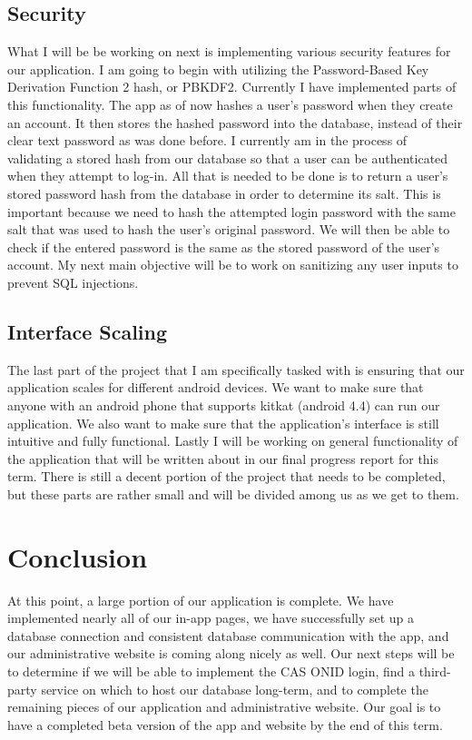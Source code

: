 \documentclass[onecolumn, draftclsnofoot,10pt, compsoc]{IEEEtran}
\begin{document}
	\subsection{Security}
		What I will be be working on next is implementing various security features for our application. I am going to begin with utilizing the Password-Based Key Derivation Function 2 hash, or PBKDF2. Currently I have implemented parts of this functionality. The app as of now hashes a user’s password when they create an account. It then stores the hashed password into the database, instead of their clear text password as was done before. I currently am in the process of validating a stored hash from our database so that a user can be authenticated when they attempt to log-in. All that is needed to be done is to return a user’s stored password hash from the database in order to determine its salt. This is important because we need to hash the attempted login password with the same salt that was used to hash the user’s original password. We will then be able to check if the entered password is the same as the stored password of the user’s account.  My next main objective will be to work on sanitizing any user inputs to prevent SQL injections.

	\subsection{Interface Scaling}
		The last part of the project that I am specifically tasked with is ensuring that our application scales for different android devices. We want to make sure that anyone with an android phone that supports kitkat (android 4.4) can run our application. We also want to make sure that the application’s interface is still intuitive and fully functional. Lastly I will be working on general functionality of the application that will be written about in our final progress report for this term. There is still a decent portion of the project that needs to be completed, but these parts are rather small and will be divided among us as we get to them.

\section{Conclusion}
	At this point, a large portion of our application is complete. We have implemented nearly all of our in-app pages, we have successfully set up a database connection and consistent database communication with the app, and our administrative website is coming along nicely as well. Our next steps will be to determine if we will be able to implement the CAS ONID login, find a third-party service on which to host our database long-term, and to complete the remaining pieces of our application and administrative website. Our goal is to have a completed beta version of the app and website by the end of this term. 
\end{document}
